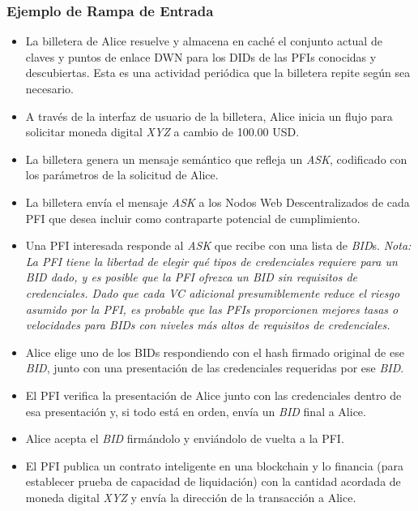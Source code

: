 \documentclass[11pt]{article}
\begin{document}
\subsubsection{Ejemplo de Rampa de Entrada}

\begin{itemize}
	\item La billetera de Alice resuelve y almacena en caché el conjunto actual de claves y puntos de enlace DWN para los DIDs de las PFIs conocidas y descubiertas. Esta es una actividad periódica que la billetera repite según sea necesario.

	\item A través de la interfaz de usuario de la billetera, Alice inicia un flujo para solicitar moneda digital \textit{XYZ} a cambio de 100.00 USD.

	\item La billetera genera un mensaje semántico que refleja un \textit{ASK}, codificado con los parámetros de la solicitud de Alice.

	\item La billetera envía el mensaje \textit{ASK} a los Nodos Web Descentralizados de cada PFI que desea incluir como contraparte potencial de cumplimiento.

	\item Una PFI interesada responde al \textit{ASK} que recibe con una lista de \textit{BID}s.\textit{ Nota: La PFI tiene la libertad de elegir qué tipos de credenciales requiere para un BID dado, y es posible que la PFI ofrezca un BID sin requisitos de credenciales. Dado que cada VC adicional presumiblemente reduce el riesgo asumido por la PFI, es probable que las PFIs proporcionen mejores tasas o velocidades para BIDs con niveles más altos de requisitos de credenciales.}

	\item Alice elige uno de los BIDs respondiendo con el hash firmado original de ese \textit{BID}, junto con una presentación de las credenciales requeridas por ese \textit{BID}.

	\item El PFI verifica la presentación de Alice junto con las credenciales dentro de esa presentación y, si todo está en orden, envía un \textit{BID} final a Alice.

	\item Alice acepta el \textit{BID} firmándolo y enviándolo de vuelta a la PFI.

	\item El PFI publica un contrato inteligente en una blockchain y lo financia (para establecer prueba de capacidad de liquidación) con la cantidad acordada de moneda digital \textit{XYZ} y envía la dirección de la transacción a Alice.


\end{itemize}
\end{document}
